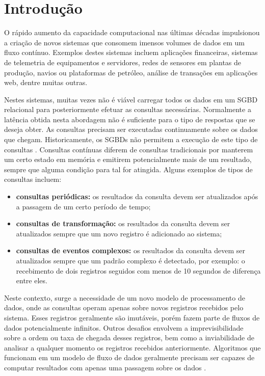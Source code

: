 \chapter{Introdução}

O rápido aumento da capacidade computacional nas últimas décadas impulsionou a criação de novos sistemas que consomem imensos volumes de dados em um fluxo contínuo. Exemplos destes sistemas incluem aplicações financeiras, sistemas de telemetria de equipamentos e servidores, redes de sensores em plantas de produção, navios ou plataformas de petróleo, análise de transações em aplicações web, dentre muitas outras.

Nestes sistemas, muitas vezes não é viável carregar todos os dados em um SGBD relacional para posteriormente efetuar as consultas necessárias. Normalmente a latência obtida nesta abordagem não é suficiente para o tipo de respostas que se deseja obter. As consultas precisam ser executadas continuamente sobre os dados que chegam. Historicamente, os SGBDs não permitem a execução de este tipo de consultas \cite{terry1992continuous}. Consultas contínuas diferem de consultas tradicionais por manterem um certo estado em memória e emitirem potencialmente mais de um resultado, sempre que alguma condição para tal for atingida. Alguns exemplos de tipos de consultas incluem:

\begin{itemize}
  \item \textbf{consultas periódicas:} os resultados da consulta devem ser atualizados após a passagem de um certo período de tempo;
  \item \textbf{consultas de transformação:} os resultados da consulta devem ser atualizados sempre que um novo registro é adicionado ao sistema;
  \item \textbf{consultas de eventos complexos:} os resultados da consulta devem ser atualizados sempre que um padrão complexo é detectado, por exemplo: o recebimento de dois registros seguidos com menos de 10 segundos de diferença entre eles.
\end{itemize}

Neste contexto, surge a necessidade de um novo modelo de processamento de dados, onde as consultas operam apenas sobre novos registros recebidos pelo sistema. Esses registros geralmente são imutáveis, porém fazem parte de fluxos de dados potencialmente infinitos. Outros desafios envolvem a imprevisibilidade sobre a ordem ou taxa de chegada desses registros, bem como a inviabilidade de analisar a qualquer momento os registros recebidos anteriormente. Algoritmos que funcionam em um modelo de fluxo de dados geralmente precisam ser capazes de computar resultados com apenas uma passagem sobre os dados \cite{babcock2002models}.


